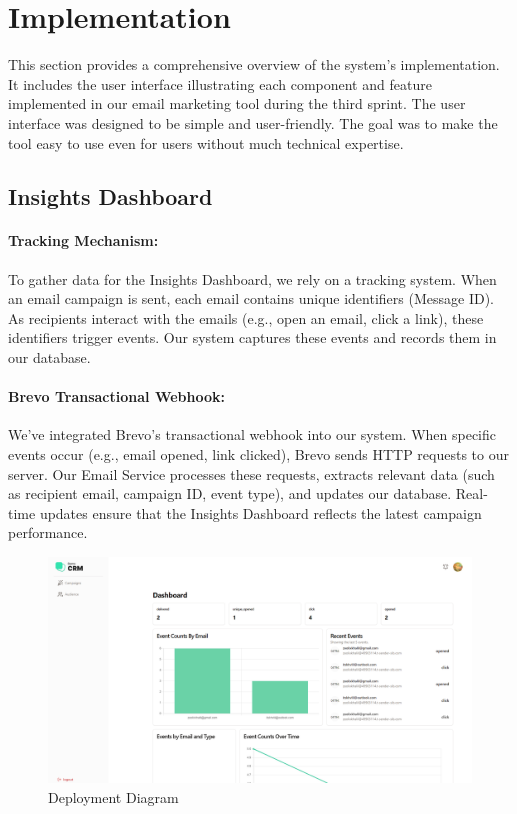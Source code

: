\section{Implementation}
This section provides a comprehensive overview of the system's implementation. It includes the user interface illustrating each component and feature implemented in our email marketing tool during the third sprint. The user interface was designed to be simple and user-friendly. The goal was to make the tool easy to use even for users without much technical expertise.

\subsection{Insights Dashboard}

\paragraph*{Tracking Mechanism:}
To gather data for the Insights Dashboard, we rely on a tracking system. When an email campaign is sent, each email contains unique identifiers (Message ID). As recipients interact with the emails (e.g., open an email, click a link), these identifiers trigger events. Our system captures these events and records them in our database.

\paragraph*{Brevo Transactional Webhook:}

We've integrated Brevo's transactional webhook into our system. When specific events occur (e.g., email opened, link clicked), Brevo sends HTTP requests to our server. Our Email Service processes these requests, extracts relevant data (such as recipient email, campaign ID, event type), and updates our database. Real-time updates ensure that the Insights Dashboard reflects the latest campaign performance.

\begin{figure}[ht]
	\centering
	\includegraphics[width=\linewidth]{Images/Sprint3/Screenshot 2024-06-04 002816.png}
	\caption{Deployment Diagram}
	\label{fig:Sprint 3 Deployment Diagram}
\end{figure}